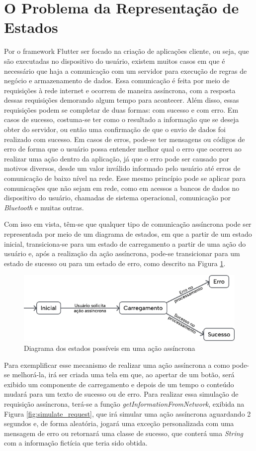 \documentclass[12pt, %
openright, 
oneside, %
a4paper,    %
brazil]{facom-ufu-abntex2}
\begin{document}
\section{O Problema da Representação de Estados}
Por o framework Flutter ser focado na criação de aplicações cliente, ou seja, que são executadas no dispositivo do usuário, existem muitos casos em que é necessário que haja a comunicação com um servidor para execução de regras de negócio e armazenamento de dados. Essa comunicação é feita por meio de requisições à rede internet e ocorrem de maneira assíncrona, com a resposta dessas requisições demorando algum tempo para acontecer. Além disso, essas requisições podem se completar de duas formas: com sucesso e com erro. Em casos de sucesso, costuma-se ter como o resultado a informação que se deseja obter do servidor, ou então uma confirmação de que o envio de dados foi realizado com sucesso. Em casos de erros, pode-se ter mensagens ou códigos de erro de forma que o usuário possa entender melhor qual o erro que ocorreu ao realizar uma ação dentro da aplicação, já que o erro pode ser causado por motivos diversos, desde um valor inválido informado pelo usuário até erros de comunicação de baixo nível na rede. Esse mesmo princípio pode se aplicar para comunicações que não sejam em rede, como em acessos a bancos de dados no dispositivo do usuário, chamadas de sistema operacional, comunicação por \textit{Bluetooth} e muitas outras.

Com isso em vista, têm-se que qualquer tipo de comunicação assíncrona pode ser representada por meio de um diagrama de estados, em que a partir de um estado inicial, transiciona-se para um estado de carregamento a partir de uma ação do usuário e, após a realização da ação assíncrona, pode-se transicionar para um estado de sucesso ou para um estado de erro, como descrito na Figura \ref{fig:states_diagram}.

\begin{figure}[ht]
    \centering
    \includegraphics[width=.6\textwidth]{figures/states/states_diagram.png}
    \caption{Diagrama dos estados possíveis em uma ação assíncrona}
    \label{fig:states_diagram}
\end{figure}

Para exemplificar esse mecanismo de realizar uma ação assíncrona a como pode-se melhorá-la, irá ser criada uma tela em que, ao apertar de um botão, será exibido um componente de carregamento e depois de um tempo o conteúdo mudará para um texto de sucesso ou de erro. Para realizar essa simulação de requisição assíncrona, terá-se a função \textit{getInformationFromNetwork}, exibida na Figura \ref{fig:simulate_request}, que irá simular uma ação assíncrona aguardando 2 segundos e, de forma aleatória, jogará uma exceção personalizada com uma mensagem de erro ou retornará uma classe de sucesso, que conterá uma \textit{String} com a informação fictícia que teria sido obtida.
\end{document}
